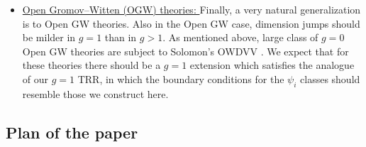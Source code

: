 \documentclass[11pt]{amsart}
\theoremstyle{definition}
\theoremstyle{remark}
\newcommand{\<}{\left<}
\renewcommand{\>}{\right>}
\numberwithin{equation}{section}
\begin{document}
\begin{itemize}
this setting and %
to seek TRRs for them. 
    \item \underline{Open Gromov--Witten (OGW) theories: }
    Finally, a very natural generalization is to Open GW theories. Also in the Open %
GW case, dimension %
jumps should be milder in $g=1$ than in $g>1.$ 
    As mentioned above, large class of %
$g=0$ Open GW %
theories are subject to Solomon's OWDVV \cite{sol_owdvv,solomon2023relative}. We expect that for these theories there should be a $g=1$ extension which satisfies the analogue of our $g=1$ TRR, in which the boundary conditions for the $\psi_i$ classes should resemble those we construct here.
\end{itemize}
\subsection{Plan of the paper}
\end{document}
